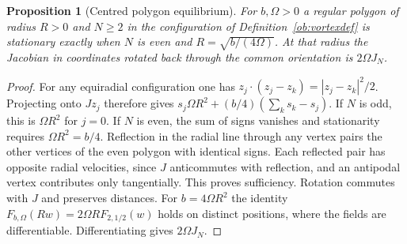 \documentclass[aps,pra,onecolumn,superscriptaddress,nofootinbib,10pt]{revtex4-2}
\newtheorem{proposition}[theorem]{Proposition}
\theoremstyle{definition}
\theoremstyle{remark}
\begin{document}
\begin{proposition}[Centred polygon equilibrium]
\label{ob:vortexequilibrium}
For $b,\Omega>0$ a regular polygon of radius $R>0$ and $N\ge2$ in the
configuration of Definition~\ref{ob:vortexdef} is stationary exactly
when $N$ is even and $R=\sqrt{b/(4\Omega)}$. At that radius the Jacobian
in coordinates rotated back through the common orientation is $2\Omega J_N$.
\end{proposition}
\begin{proof}
For any equiradial configuration one has
$z_j\cdot (z_j-z_k)=|z_j-z_k|^2/2$. Projecting onto $Jz_j$
therefore gives $s_j\Omega R^2+(b/4)(\sum_k s_k-s_j)$.
If $N$ is odd, this is $\Omega R^2$ for $j=0$. If $N$ is even, the sum
of signs vanishes and stationarity requires $\Omega R^2=b/4$.
Reflection in the radial line through any vertex pairs the other
vertices of the even polygon with identical signs. Each reflected pair
has opposite radial velocities, since $J$ anticommutes with reflection,
and an antipodal vertex contributes only tangentially. This proves
sufficiency. Rotation commutes with $J$ and preserves distances.
For $b=4\Omega R^2$ the identity
$F_{b,\Omega}(Rw)=2\Omega R F_{2,1/2}(w)$ holds on distinct positions,
where the fields are differentiable. Differentiating gives $2\Omega J_N$.
\end{proof}
\end{document}
